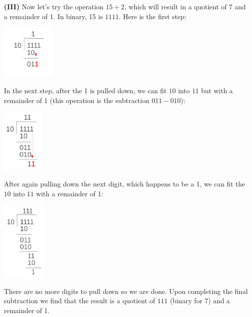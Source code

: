 \documentclass[12pt]{article}
\begin{document}
	\hspace{0.45cm}
	\begin{minipage}[t]{.5\linewidth} 
		\par\noindent \textbf{(III)} Now let's try the operation \(15 \div 2\), which will result in a quotient of 7 and a remainder of 1. In binary, 15 is \(1111\). Here is the first step:
		
		\begin{center}
			\includegraphics[width=2.7cm]{bin-div-3.png}
		\end{center}
	
		\par\noindent In the next step, after the 1 is pulled down, we can fit \(10\) into \(11\) but with a remainder of 1 (this operation is the subtraction \(011-010\)):	
		
		\begin{center}
			\includegraphics[width=2.0cm]{bin-div-4.png}
		\end{center}
		
		\par\noindent After again pulling down the next digit, which happens to be a 1, we can fit the \(10\) into \(11\) with a remainder of 1:
		
				\begin{center}
			\includegraphics[width=2.2cm]{bin-div-5.png}
		\end{center}
	
		\par\noindent There are no more digits to pull down so we are done. Upon completing the final subtraction we find that the result is a quotient of \(111\) (binary for 7) and a remainder of 1.
	
	\end{minipage}
\end{document}
